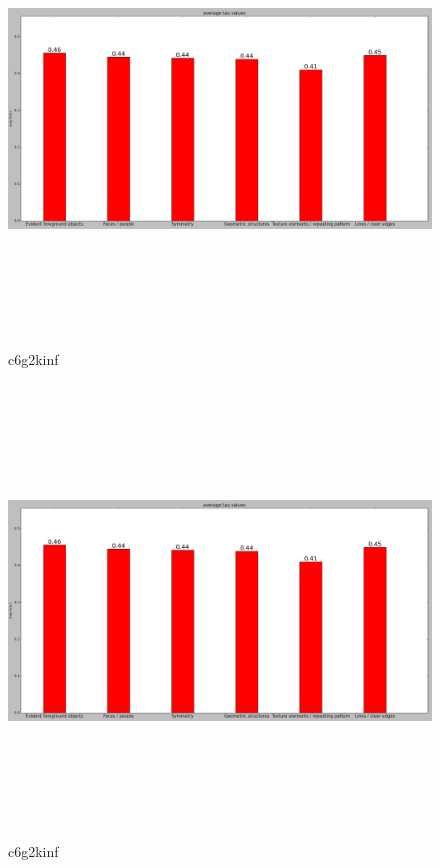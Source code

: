 		
		\begin{figure}[h] \label{c6g2k3}
			\includegraphics[width=\linewidth,height=12cm,keepaspectratio]{Figures/c6g2kinf}
			\caption[c6g2kinf]
			{c6g2kinf}
		\end{figure}
		
		\begin{figure}[h] \label{c6g2kinf}
			\includegraphics[width=\linewidth,height=12cm,keepaspectratio]{Figures/c6g2kinf}
			\caption[c6g2kinf]
			{c6g2kinf}
		\end{figure}
		
